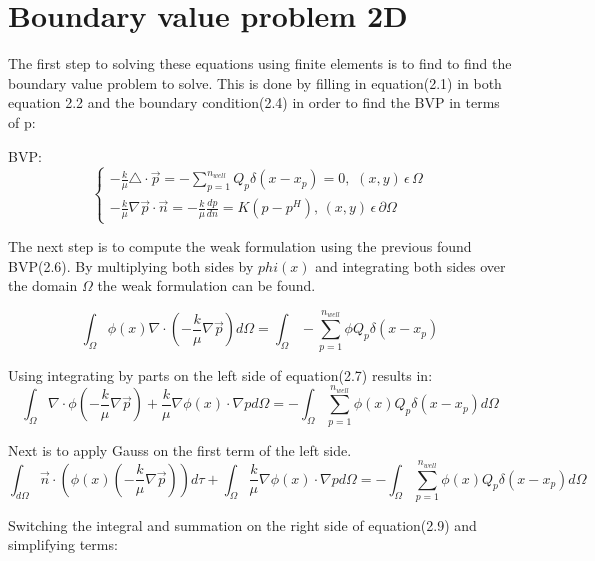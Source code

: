 \documentclass{report}
\begin{document}
\section{Boundary value problem 2D}
The first step to solving these equations using finite elements is to find to find the boundary value problem to solve. This is done by filling in equation(2.1) in both equation 2.2 and the boundary condition(2.4) in order to find the BVP in terms of p:
\vspace{5mm}

BVP:
\begin{equation}
	\begin{cases}
		-\frac{k}{\mu}\triangle\cdot\vec{p}=-\sum_{p=1}^{n_{well}}Q_p\delta(x-x_p)=0,\, \, (x,y) \, \epsilon \, \Omega\\
		-\frac{k}{\mu}\nabla\vec{p}\cdot\vec{n}=-\frac{k}{\mu}\frac{dp}{dn} =K(p-p^H), \, (x,y)\,  \epsilon  \, \partial\Omega
	\end{cases}
\end{equation}

\bigskip

The next step is to compute the weak formulation using the previous found BVP(2.6). By multiplying both sides by $phi(x)$ and integrating both sides over the domain $\Omega$ the weak formulation can be found.

\begin{equation}
	\int_{\Omega}\phi(x)\nabla\cdot( -\frac{k}{\mu}\nabla\vec{p}) d\Omega =\int_{\Omega}-\sum_{p=1}^{n_{well}}\phi  Q_p\delta(x-x_p)
\end{equation}

Using integrating by parts on the left side of equation(2.7) results in:
\begin{equation}
	\int_{\Omega}\nabla\cdot\phi(-\frac{k}{\mu}\nabla\vec{p})+\frac{k}{\mu}\nabla\phi(x)\cdot\nabla p d\Omega= -\int_{\Omega}\sum_{p=1}^{n_{well}}\phi(x) Q_p\delta(x-x_p)d\Omega
\end{equation}

Next is to apply Gauss on the first term of the left side.
\begin{equation}
	\int_{d\Omega}\vec{n}\cdot(\phi(x)(-\frac{k}{\mu}\nabla\vec{p}))d\tau+\int_{\Omega}\frac{k}{\mu}\nabla\phi(x)\cdot\nabla p d\Omega= -\int_{\Omega}\sum_{p=1}^{n_{well}}\phi(x) Q_p\delta(x-x_p)d\Omega
\end{equation}


Switching the integral and summation on the right side of equation(2.9) and simplifying terms:
\end{document}

